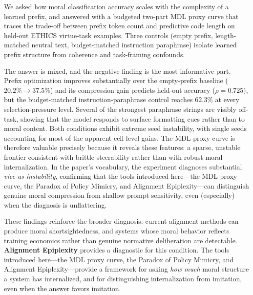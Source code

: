 \documentclass[preprint]{article}
\begin{document}
We asked how moral classification accuracy scales with the complexity of a learned prefix, and answered with a budgeted two-part MDL proxy curve that traces the trade-off between prefix token count and predictive code length on held-out ETHICS virtue-task examples.
Three controls (empty prefix, length-matched neutral text, budget-matched instruction paraphrase) isolate learned prefix structure from coherence and task-framing confounds.

The answer is mixed, and the negative finding is the most informative part.
Prefix optimization improves substantially over the empty-prefix baseline ($20.2\% \to 37.5\%$) and its compression gain predicts held-out accuracy ($\rho = 0.725$), but the budget-matched instruction-paraphrase control reaches $62.3\%$ at every selection-pressure level.
Several of the strongest paraphrase strings are visibly off-task, showing that the model responds to surface formatting cues rather than to moral content.
Both conditions exhibit extreme seed instability, with single seeds accounting for most of the apparent cell-level gains.
The MDL proxy curve is therefore valuable precisely because it reveals these features: a sparse, unstable frontier consistent with brittle steerability rather than with robust moral internalization.
In the paper's vocabulary, the experiment diagnoses substantial \emph{vice-as-instability}, confirming that the tools introduced here---the MDL proxy curve, the Paradox of Policy Mimicry, and Alignment Epiplexity---can distinguish genuine moral compression from shallow prompt sensitivity, even (especially) when the diagnosis is unflattering.

These findings reinforce the broader diagnosis: current alignment methods can produce moral shortsightedness, and systems whose moral behavior reflects training economics rather than genuine normative deliberation are detectable.
\textbf{Alignment Epiplexity} provides a diagnostic for this condition.
The tools introduced here---the MDL proxy curve, the Paradox of Policy Mimicry, and Alignment Epiplexity---provide a framework for asking \emph{how much} moral structure a system has internalized, and for distinguishing internalization from imitation, even when the answer favors imitation.



\end{document}
